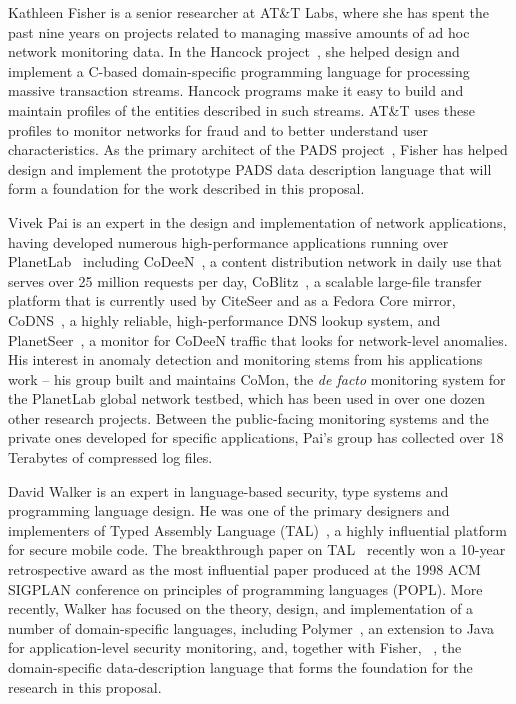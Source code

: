 \documentclass[12pt]{article}
\begin{document}
Kathleen Fisher is a senior researcher at AT\&T Labs,
where she has spent the past nine years on projects
related to managing massive amounts of ad hoc network monitoring data.
In the Hancock project~\cite{kdd00,hancock-toplas}, she helped 
design and implement a C-based
domain-specific programming language for processing massive  
transaction streams.  Hancock programs make it easy to build
and maintain profiles of the entities described in such streams. 
AT\&T uses these profiles to monitor networks for fraud 
and to better understand user characteristics.
As the primary architect of the PADS project~\cite{fisher+:pads,fisher+:popl06,daly+:pads-demo,mandelbaum+:pads-ml}, 
Fisher has helped design and implement the prototype PADS
data description language that will form a foundation for the work
described in this proposal.  

Vivek Pai is an expert in the design and implementation of network
applications, having developed numerous high-performance applications
running over PlanetLab~\cite{planetlab} including
CoDeeN~\cite{PaiDark, codeen04}, a content distribution network in daily use that
serves over 25 million requests per day, CoBlitz~\cite{coblitz}, a
scalable large-file transfer platform that is currently used by
CiteSeer and as a Fedora Core mirror, CoDNS~\cite{codns}, a highly
reliable, high-performance DNS lookup system, and
PlanetSeer~\cite{Zhang_OSDI_2004}, a monitor for CoDeeN traffic that looks
for network-level anomalies.  His interest in anomaly detection and
monitoring stems from his applications work -- his group built and
maintains CoMon, the {\it de facto} monitoring system for the
PlanetLab global network testbed, which has been used in over one
dozen other research projects. Between the public-facing monitoring
systems and the private ones developed for specific applications, Pai's
group has collected over 18 Terabytes of compressed log files.

David Walker is an expert in language-based security,
type systems and programming language design.
He was one of the primary designers 
and implementers
of Typed Assembly Language (TAL)~\cite{morrisett+:tal-popl,morrisett+:tal,morrisett+:journal-stal}, 
a highly influential platform
for secure mobile code.  The breakthrough paper on 
TAL~\cite{morrisett+:tal-popl} recently won a 10-year retrospective
award as the most influential paper produced at the 1998 ACM SIGPLAN conference
on principles of programming languages (POPL).  More recently, Walker
has focused on the theory, design, and implementation of a number of
domain-specific languages, including
Polymer~\cite{bauer+:polymer,ligatti+:renewal,ligatti+:edit-automata}, an
extension to Java for application-level security monitoring, and,
together with Fisher, \pads{}~\cite{fisher+:pads,fisher+:popl06,daly+:pads-demo,mandelbaum+:pads-ml}, the domain-specific data-description language that forms 
the foundation for the research in this proposal.
\end{document}
